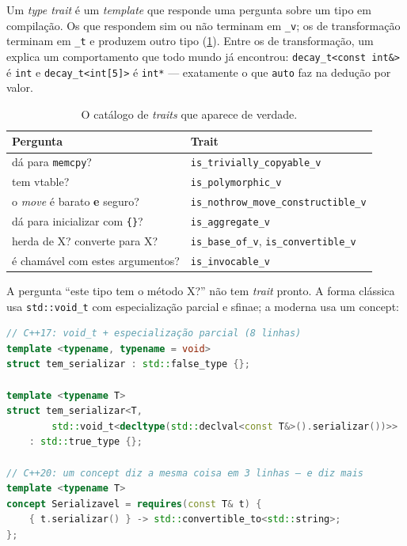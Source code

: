 Um \emph{type trait} é um \emph{template} que responde uma pergunta sobre um
tipo em compilação. Os que respondem sim ou não terminam em \texttt{\_v}; os de
transformação terminam em \texttt{\_t} e produzem outro tipo
(\cref{tab:traits}). Entre os de transformação, um explica um comportamento que
todo mundo já encontrou: \texttt{decay\_t<const int\&>} é \texttt{int} e
\texttt{decay\_t<int[5]>} é \texttt{int*} --- exatamente o que \texttt{auto} faz
na dedução por valor.

\begin{table}[htbp]
\centering
\caption{O catálogo de \emph{traits} que aparece de verdade.}
\label{tab:traits}
\footnotesize
\begin{tabular}{@{}ll@{}}
\toprule
\textbf{Pergunta} & \textbf{Trait} \\
\midrule
dá para \texttt{memcpy}?                  & \texttt{is\_trivially\_copyable\_v} \\
tem \gls{vtable}?                         & \texttt{is\_polymorphic\_v} \\
o \emph{move} é barato \textbf{e} seguro? & \texttt{is\_nothrow\_move\_constructible\_v} \\
dá para inicializar com \texttt{\{\}}?    & \texttt{is\_aggregate\_v} \\
herda de X? converte para X?              & \texttt{is\_base\_of\_v}, \texttt{is\_convertible\_v} \\
é chamável com estes argumentos?          & \texttt{is\_invocable\_v} \\
\bottomrule
\end{tabular}
\end{table}

A pergunta ``este tipo tem o método X?'' não tem \emph{trait} pronto. A forma
clássica usa \texttt{std::void\_t} com especialização parcial e \gls{sfinae}; a
moderna usa um \gls{concept}:

\begin{lstlisting}[style=bt, language=C++,
    caption={O mesmo teste, em C++17 e em C++20, em
             \texttt{src/compile\_time/demo\_static\_assert.hpp}.}]
// C++17: void_t + especialização parcial (8 linhas)
template <typename, typename = void>
struct tem_serializar : std::false_type {};

template <typename T>
struct tem_serializar<T,
        std::void_t<decltype(std::declval<const T&>().serializar())>>
    : std::true_type {};

// C++20: um concept diz a mesma coisa em 3 linhas — e diz mais
template <typename T>
concept Serializavel = requires(const T& t) {
    { t.serializar() } -> std::convertible_to<std::string>;
};
\end{lstlisting}

